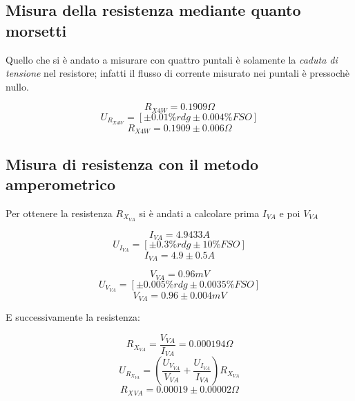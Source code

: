 \documentclass[a4paper]{article}
\begin{document}
\subsection{Misura della resistenza mediante quanto morsetti}
Quello che si è andato a misurare con quattro puntali è solamente la \emph{caduta di tensione} nel resistore; infatti il flusso di corrente misurato nei puntali è pressochè nullo.
\begin{Large}
	\begin{equation}
		R_{X4W}= 0.1909 \Omega
	\end{equation}
	\begin{equation}
		U_{R_{X4W}} = [\pm 0.01\%rdg \pm 0.004\% FSO]
	 \end{equation}
	 \begin{equation}
		R_{X4W} = 0.1909\pm 0.006 \Omega
	 \end{equation}
\end{Large}
\subsection{Misura di resistenza con il metodo amperometrico}
Per ottenere la resistenza $R_{X_{VA}}$ si è andati a calcolare prima $I_{VA}$ e poi $V_{VA}$
\begin{Large}
	\begin{equation}
		I_{VA}= 4.9433 A
	\end{equation}
	\begin{equation}
		U_{I_{VA}} = [\pm 0.3\%rdg \pm 10\% FSO]
	 \end{equation}
	 \begin{equation}
		I_{VA} = 4.9 \pm 0.5 A
	 \end{equation}
\end{Large}

\begin{Large}
	\begin{equation}
		V_{VA}= 0.96 mV
	\end{equation}
	\begin{equation}
		U_{V_{VA}} = [\pm 0.005\%rdg \pm 0.0035\% FSO]
	 \end{equation}
	 \begin{equation}
		V_{VA} = 0.96 \pm 0.004 mV
	 \end{equation}
\end{Large}
E successivamente la resistenza:
\begin{Large}
	\begin{equation}
		R_{X_{VA}}= \frac{V_{VA}}{I_{VA}} =0.000194 \Omega
	\end{equation}
	\begin{equation}
		U_{R_{X_{VA}}} = (\frac{U_{V_{VA}}}{V_{VA}}+\frac{U_{I_{VA}}}{I_{VA}})R_{X_{VA}}
	 \end{equation}
	 \begin{equation}
		R_X{_{VA}} = 0.00019\pm 0.00002\Omega
	 \end{equation}
\end{Large}
\end{document}
